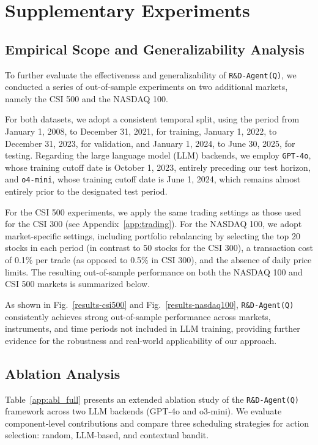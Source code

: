 \documentclass{article}
\newcommand{\name}{\texttt{R\&D-Agent(Q)}}
\begin{document}
\section{Supplementary Experiments} \label{app_exp_details}
\subsection{Empirical Scope and Generalizability Analysis} \label{app_esga}

To further evaluate the effectiveness and generalizability of \texttt{\name}, we conducted a series of out-of-sample experiments on two additional markets, namely the CSI 500 and the NASDAQ 100.

For both datasets, we adopt a consistent temporal split, using the period from January 1, 2008, to December 31, 2021, for training, January 1, 2022, to December 31, 2023, for validation, and January 1, 2024, to June 30, 2025, for testing. Regarding the large language model (LLM) backends, we employ \texttt{GPT-4o}, whose training cutoff date is October 1, 2023, entirely preceding our test horizon, and \texttt{o4-mini}, whose training cutoff date is June 1, 2024, which remains almost entirely prior to the designated test period.

For the CSI 500 experiments, we apply the same trading settings as those used for the CSI 300 (see Appendix~\ref{app:trading}). For the NASDAQ 100, we adopt market-specific settings, including portfolio rebalancing by selecting the top 20 stocks in each period (in contrast to 50 stocks for the CSI 300), a transaction cost of 0.1\% per trade (as opposed to 0.5\% in CSI 300), and the absence of daily price limits. The resulting out-of-sample performance on both the NASDAQ 100 and CSI 500 markets is summarized below.




As shown in Fig.~\ref{results-csi500} and Fig.~\ref{results-nasdaq100}, \texttt{\name} consistently achieves strong out-of-sample performance across markets, instruments, and time periods not included in LLM training, providing further evidence for the robustness and real-world applicability of our approach.

\subsection{Ablation Analysis} \label{app:abl}
Table~\ref{app:abl_full} presents an extended ablation study of the \texttt{\name} framework across two LLM backends (GPT-4o and o3-mini). We evaluate component-level contributions and compare three scheduling strategies for action selection: random, LLM-based, and contextual bandit.
\end{document}
